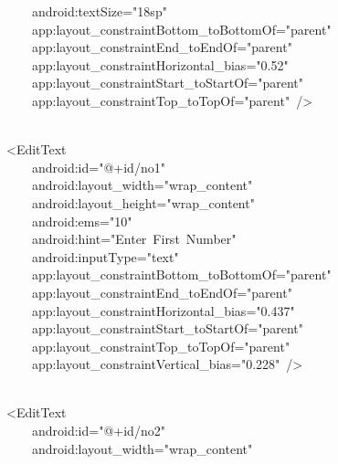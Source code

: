 {\ttfamily\small \ \ \ \ \ \ \ \ android:textSize="18sp"} \\
{\ttfamily\small \ \ \ \ \ \ \ \ app:layout\_constraintBottom\_toBottomOf="parent"} \\
{\ttfamily\small \ \ \ \ \ \ \ \ app:layout\_constraintEnd\_toEndOf="parent"} \\
{\ttfamily\small \ \ \ \ \ \ \ \ app:layout\_constraintHorizontal\_bias="0.52"} \\
{\ttfamily\small \ \ \ \ \ \ \ \ app:layout\_constraintStart\_toStartOf="parent"} \\
{\ttfamily\small \ \ \ \ \ \ \ \ app:layout\_constraintTop\_toTopOf="parent"\ /\textgreater{}} \\
\strut \\
{\ttfamily\small \ \ \ \ \textless{}EditText} \\
{\ttfamily\small \ \ \ \ \ \ \ \ android:id="@+id/no1"} \\
{\ttfamily\small \ \ \ \ \ \ \ \ android:layout\_width="wrap\_content"} \\
{\ttfamily\small \ \ \ \ \ \ \ \ android:layout\_height="wrap\_content"} \\
{\ttfamily\small \ \ \ \ \ \ \ \ android:ems="10"} \\
{\ttfamily\small \ \ \ \ \ \ \ \ android:hint="Enter\ First\ Number"} \\
{\ttfamily\small \ \ \ \ \ \ \ \ android:inputType="text"} \\
{\ttfamily\small \ \ \ \ \ \ \ \ app:layout\_constraintBottom\_toBottomOf="parent"} \\
{\ttfamily\small \ \ \ \ \ \ \ \ app:layout\_constraintEnd\_toEndOf="parent"} \\
{\ttfamily\small \ \ \ \ \ \ \ \ app:layout\_constraintHorizontal\_bias="0.437"} \\
{\ttfamily\small \ \ \ \ \ \ \ \ app:layout\_constraintStart\_toStartOf="parent"} \\
{\ttfamily\small \ \ \ \ \ \ \ \ app:layout\_constraintTop\_toTopOf="parent"} \\
{\ttfamily\small \ \ \ \ \ \ \ \ app:layout\_constraintVertical\_bias="0.228"\ /\textgreater{}} \\
\strut \\
{\ttfamily\small \ \ \ \ \textless{}EditText} \\
{\ttfamily\small \ \ \ \ \ \ \ \ android:id="@+id/no2"} \\
{\ttfamily\small \ \ \ \ \ \ \ \ android:layout\_width="wrap\_content"} \\
